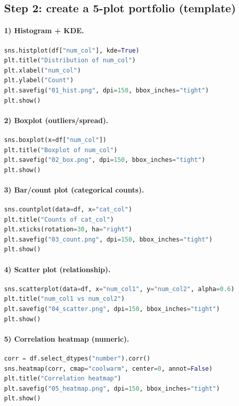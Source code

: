 \documentclass[11pt]{article}
\begin{document}
\subsection{Step 2: create a 5-plot portfolio (template)}
\paragraph{1) Histogram + KDE.}
\begin{lstlisting}[language=Python]
sns.histplot(df["num_col"], kde=True)
plt.title("Distribution of num_col")
plt.xlabel("num_col")
plt.ylabel("Count")
plt.savefig("01_hist.png", dpi=150, bbox_inches="tight")
plt.show()
\end{lstlisting}

\paragraph{2) Boxplot (outliers/spread).}
\begin{lstlisting}[language=Python]
sns.boxplot(x=df["num_col"])
plt.title("Boxplot of num_col")
plt.savefig("02_box.png", dpi=150, bbox_inches="tight")
plt.show()
\end{lstlisting}

\paragraph{3) Bar/count plot (categorical counts).}
\begin{lstlisting}[language=Python]
sns.countplot(data=df, x="cat_col")
plt.title("Counts of cat_col")
plt.xticks(rotation=30, ha="right")
plt.savefig("03_count.png", dpi=150, bbox_inches="tight")
plt.show()
\end{lstlisting}

\paragraph{4) Scatter plot (relationship).}
\begin{lstlisting}[language=Python]
sns.scatterplot(data=df, x="num_col1", y="num_col2", alpha=0.6)
plt.title("num_col1 vs num_col2")
plt.savefig("04_scatter.png", dpi=150, bbox_inches="tight")
plt.show()
\end{lstlisting}

\paragraph{5) Correlation heatmap (numeric).}
\begin{lstlisting}[language=Python]
corr = df.select_dtypes("number").corr()
sns.heatmap(corr, cmap="coolwarm", center=0, annot=False)
plt.title("Correlation heatmap")
plt.savefig("05_heatmap.png", dpi=150, bbox_inches="tight")
plt.show()
\end{lstlisting}
\end{document}
